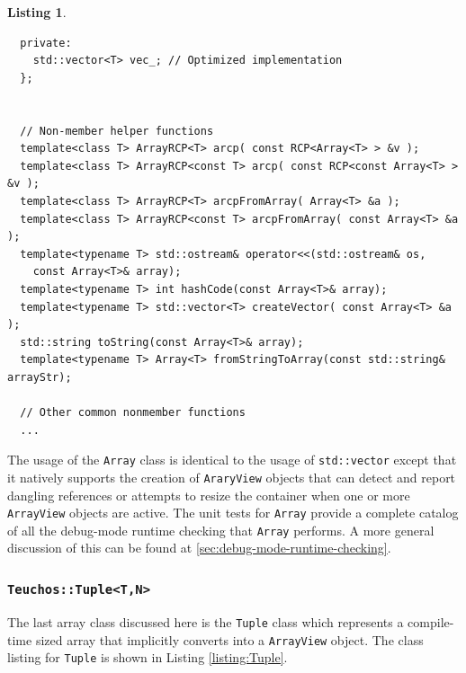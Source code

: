 \documentclass[pdf,ps2pdf,11pt]{SANDreport}
\newtheorem{listing}{Listing}
\begin{document}
\begin{listing}
{\begin{verbatim}
  private:
    std::vector<T> vec_; // Optimized implementation
  };
  
  
  // Non-member helper functions
  template<class T> ArrayRCP<T> arcp( const RCP<Array<T> > &v );
  template<class T> ArrayRCP<const T> arcp( const RCP<const Array<T> > &v );
  template<class T> ArrayRCP<T> arcpFromArray( Array<T> &a );
  template<class T> ArrayRCP<const T> arcpFromArray( const Array<T> &a );
  template<typename T> std::ostream& operator<<(std::ostream& os,
    const Array<T>& array);
  template<typename T> int hashCode(const Array<T>& array);
  template<typename T> std::vector<T> createVector( const Array<T> &a );
  std::string toString(const Array<T>& array);
  template<typename T> Array<T> fromStringToArray(const std::string& arrayStr);

  // Other common nonmember functions
  ...
\end{verbatim}}
\end{listing}

The usage of the {}\texttt{Array} class is identical to the usage of
{}\texttt{std::vector} except that it natively supports the creation
of {}\texttt{AraryView} objects that can detect and report dangling
references or attempts to resize the container when one or more
{}\texttt{ArrayView} objects are active.  The unit tests for
{}\texttt{Array} provide a complete catalog of all the debug-mode
runtime checking that {}\texttt{Array} performs.  A more general
discussion of this can be found at
{}\ref{sec:debug-mode-runtime-checking}.


%
{}\subsubsection{\texttt{Teuchos::Tuple<T,N>}}
%

The last array class discussed here is the {}\texttt{Tuple} class
which represents a compile-time sized array that implicitly converts
into a {}\texttt{ArrayView} object.  The class listing for
{}\texttt{Tuple} is shown in Listing {}\ref{listing:Tuple}.
\end{document}
